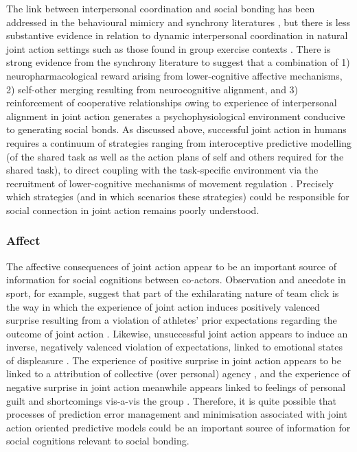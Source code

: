 \begin{CJK}{UTF8}{gbsn}
The link between interpersonal coordination and social bonding has been addressed in the behavioural mimicry and synchrony literatures \citep[e.g.,][]{Wheatley2012,Launay2016,Mogan2017}, but there is less substantive evidence in relation to dynamic interpersonal coordination in natural joint action settings such as those found in group exercise contexts \citep{Marsh2009,Miles2009,Lumsden2012}.  There is strong evidence from the synchrony literature to suggest that a combination of 1) neuropharmacological reward arising from lower-cognitive affective mechanisms, 2) self-other merging resulting from neurocognitive alignment, and 3) reinforcement of cooperative relationships owing to experience of interpersonal alignment in joint action generates a psychophysiological environment conducive to generating social bonds.  As discussed above, successful joint action in humans requires a continuum of strategies ranging from interoceptive predictive modelling (of the shared task as well as the action plans of self and others required for the shared task), to direct coupling with the task-specific environment via the recruitment of lower-cognitive mechanisms of movement regulation \citep[e.g., proprioceptive mechanisms of balance and orientation][]{Semin2008} .  Precisely which strategies (and in which scenarios these strategies) could be responsible for social connection in joint action remains poorly understood.

\subsubsection{Affect}
The affective consequences of joint action appear to be an important source of information for social cognitions between co-actors.  Observation and anecdote in sport, for example, suggest that part of the exhilarating nature of team click is the way in which the experience of joint action induces positively valenced surprise resulting from a violation of athletes' prior expectations regarding the outcome of joint action \citep{Jackson1999}.  Likewise, unsuccessful joint action appears to induce an inverse, negatively valenced violation of expectations, linked to emotional states of displeasure \citep{Ekkekakis2003}.  The experience of positive surprise in joint action appears to be linked to a attribution of collective (over personal) agency \cite{Sato2005,Sato2008}, and the experience of negative surprise in joint action meanwhile appears linked to feelings of personal guilt and shortcomings vis-a-vis the group \citep{Kenworthy2011,Mckimmie2015}.  Therefore, it is quite possible that processes of prediction error management and minimisation associated with joint action oriented predictive models could be an important source of information for social cognitions relevant to social bonding.


\end{CJK}
